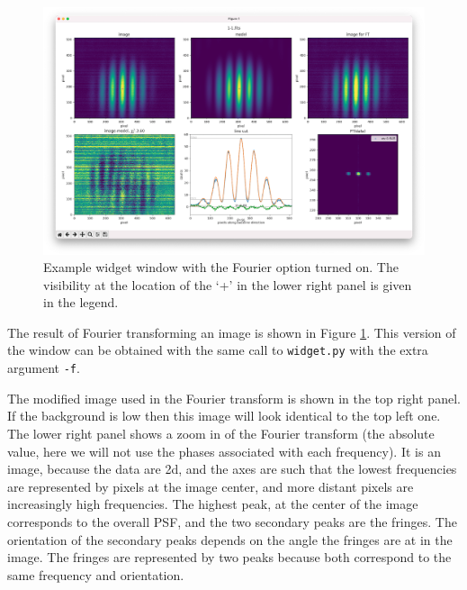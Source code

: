 \documentclass[11pt]{article}
\begin{document}
\begin{figure}[h]
    \centering
   \includegraphics[width=1\textwidth]{widget-fourier.png}
    \caption{Example widget window with the Fourier option turned on. The visibility at the location of the `+' in the lower right panel is given in the legend.}
    \label{fig:widget-f}
\end{figure}

The result of Fourier transforming an image is shown in Figure \ref{fig:widget-f}. This version of the window can be obtained with the same call to \texttt{widget.py} with the extra argument \texttt{-f}.

The modified image used in the Fourier transform is shown in the top right panel. If the background is low then this image will look identical to the top left one. The lower right panel shows a zoom in of the Fourier transform (the absolute value, here we will not use the phases associated with each frequency). It is an image, because the data are 2d, and the axes are such that the lowest frequencies are represented by pixels at the image center, and more distant pixels are increasingly high frequencies. The highest peak, at the center of the image corresponds to the overall PSF, and the two secondary peaks are the fringes. The orientation of the secondary peaks depends on the angle the fringes are at in the image. The fringes are represented by two peaks because both correspond to the same frequency and orientation.
\end{document}

